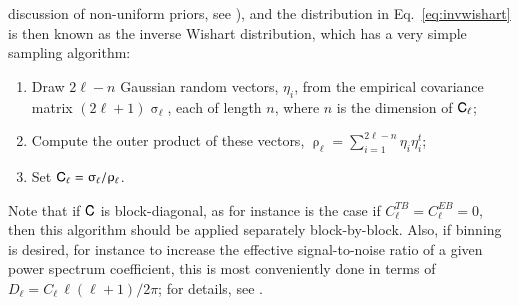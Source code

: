 \documentclass[twocolumn]{aa}
\renewcommand{\C}[0]{\tens{C}}
\begin{document}
discussion of non-uniform priors, see \citealp{larson:2006}), and the
distribution in Eq.~\eqref{eq:invwishart} is then known as the inverse
Wishart distribution, which has a very simple sampling algorithm:
\begin{enumerate}
  \item Draw $2\ell-n$ Gaussian random vectors, $\eta_i$, from the
    empirical covariance matrix $(2\ell+1)\upsigma_{\ell}$, each of
    length $n$, where $n$ is the dimension of $\C_{\ell}$;
  \item Compute the outer product of these vectors, $\uprho_{\ell} =
    \sum_{i=1}^{2\ell-n} \eta_i\eta_i^t$;
  \item Set $\C_{\ell} = \upsigma_\ell/\uprho_{\ell}$.
\end{enumerate}
Note that if $\C$ is block-diagonal, as for instance is the case if
$C_{\ell}^{TB} = C_{\ell}^{EB}=0$, then this algorithm should be
applied separately block-by-block. Also, if binning is desired, for
instance to increase the effective signal-to-noise ratio of a given
power spectrum coefficient, this is most conveniently done in terms of
$D_{\ell} = C_{\ell}\,\ell(\ell+1)/2\pi$; for details, see
\citet{larson:2006}.
\end{document}
